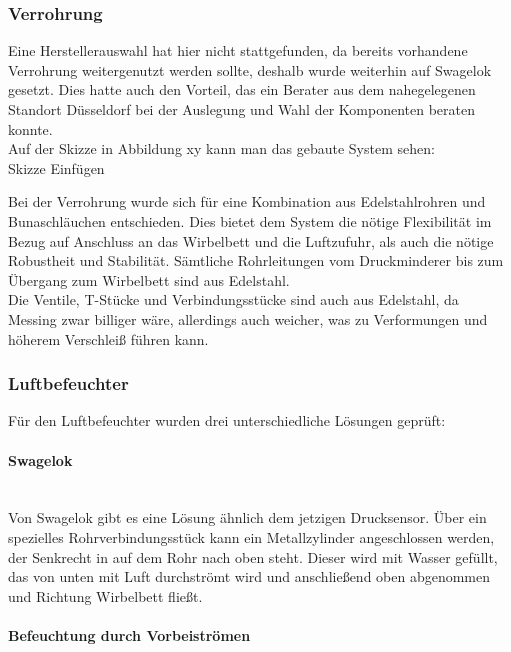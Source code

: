 \subsubsection{Verrohrung}

Eine Herstellerauswahl hat hier nicht stattgefunden, da bereits vorhandene Verrohrung weitergenutzt werden sollte, deshalb wurde weiterhin auf Swagelok gesetzt. Dies hatte auch den Vorteil, das ein Berater aus dem nahegelegenen Standort Düsseldorf bei der Auslegung und Wahl der Komponenten beraten konnte. \\
Auf der Skizze in Abbildung xy kann man das gebaute System sehen:
\hfill \\

Skizze Einfügen


Bei der Verrohrung wurde sich für eine Kombination aus Edelstahlrohren und Bunaschläuchen entschieden. Dies bietet dem System die nötige Flexibilität im Bezug auf Anschluss an das Wirbelbett und die Luftzufuhr, als auch die nötige Robustheit und Stabilität. Sämtliche Rohrleitungen vom Druckminderer bis zum Übergang zum Wirbelbett sind aus Edelstahl. \\
Die Ventile, T-Stücke und Verbindungsstücke sind auch aus Edelstahl, da Messing zwar billiger wäre, allerdings auch weicher, was zu Verformungen und höherem Verschleiß führen kann.


\subsubsection{Luftbefeuchter}

Für den Luftbefeuchter wurden drei unterschiedliche Lösungen geprüft:

\paragraph{Swagelok} 

\hfill \\

Von Swagelok gibt es eine Lösung ähnlich dem jetzigen Drucksensor. Über ein spezielles Rohrverbindungsstück kann ein Metallzylinder angeschlossen werden, der Senkrecht in auf dem Rohr nach oben steht. Dieser wird mit Wasser gefüllt, das von unten mit Luft durchströmt wird und anschließend oben abgenommen und Richtung Wirbelbett fließt.

\paragraph{Befeuchtung durch Vorbeiströmen}

